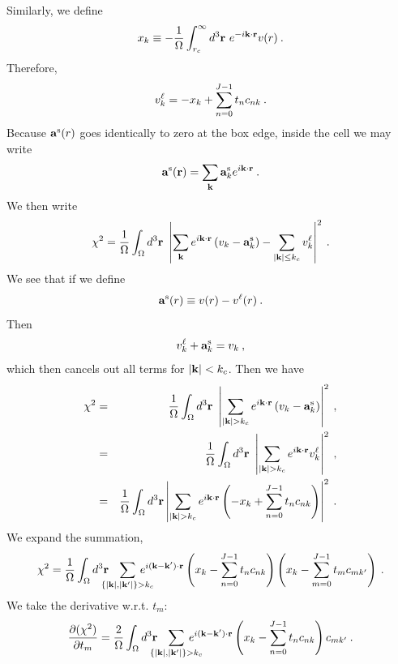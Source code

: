 Similarly, we define
\begin{equation}
x_k \equiv -\frac{1}{\Omega} \int_{r_c}^\infty d^3\mathbf{r} \ e^{-i\mathbf{k}\cdot\mathbf{r}} v(r)\:.
\end{equation}
Therefore,
\begin{equation}
v^\ell_k = -x_k + \sum_{n=0}^{J-1} t_n c_{nk}\:. 
\end{equation}
Because $\mathbf{a}^{\text{s}}(r)$ goes identically to zero at the box edge, inside the
cell we may write
\begin{equation}
\mathbf{a}^{\text{s}}(\mathbf{r}) = \sum_{\mathbf{k}} \mathbf{a}^{\text{s}}_k e^{i\mathbf{k} \cdot \mathbf{r}}\:.
\end{equation}
We then write
\begin{equation}
\chi^2 = \frac{1}{\Omega} \int_\Omega d^3 \vr \ 
\left| \sum_\vk e^{i\vk \cdot \vr} \left(v_k - \vs_k \right)
-\sum_{|\vk| \le k_c} \vl_k \right|^2\:.
\end{equation}
We see that if we define
\begin{equation}
\mathbf{a}^{\text{s}}(r) \equiv v(r) - v^\ell(r)\:.
\end{equation}
Then
\begin{equation}
v^\ell_k + \mathbf{a}^{\text{s}}_k = v_k\:,
\end{equation}
which then cancels out all terms for $|\mathbf{k}| < k_c$.  Then we have
\begin{eqnarray}
\chi^2 & = & \frac{1}{\Omega} \int_\Omega d^3 \vr \ 
\left|\sum_{|\vk|>k_c} e^{i\vk\cdot\vr} 
\left(v_k -\vs_k \right)\right|^2\:, \\
& = & \frac{1}{\Omega} \int_\Omega d^3 \vr \ 
\left|\sum_{|\vk|>k_c} e^{i\vk\cdot\vr} \vl_k \right|^2\:, \\ 
& = & 
\frac{1}{\Omega} \int_\Omega d^3 \vr
\left|\sum_{|\vk|>k_c} e^{i\vk\cdot\vr}\left( -x_k + \sum_{n=0}^{J-1} t_n
c_{nk}\right) \right|^2\:.
\end{eqnarray}
We expand the summation,
\newcommand{\ns}{\negthickspace}
\begin{equation}
\chi^2 = \frac{1}{\Omega} \int_\Omega d^3 \vr \ns \ns \ns
\sum_{\{|\vk|,|\vk'|\}>k_c} \ns\ns\ns\ns\ns
 e^{i(\vk-\vk')\cdot \vr}
\left(x_k -\sum_{n=0}^{J-1} t_n c_{nk} \right)
\left(x_k -\sum_{m=0}^{J-1} t_{m} c_{mk'} \right)\:.
\end{equation}
We take the derivative w.r.t. $t_{m}$:
\begin{equation}
\frac{\partial (\chi^2)}{\partial t_{m}} =
\frac{2}{\Omega}\int_\Omega d^3 \vr \ns \ns \ns
\sum_{\{|\vk|,|\vk'|\}>k_c} \ns\ns\ns\ns\ns
 e^{i(\vk-\vk')\cdot \vr}
\left(x_k -\sum_{n=0}^{J-1} t_n c_{nk} \right) c_{mk'}\:.
\end{equation}
